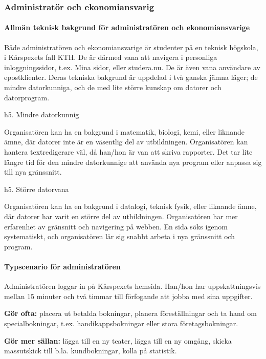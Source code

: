 \documentclass[a4paper, twoside, 11pt, titlepage]{article}
\begin{document}
		\subsubsection{Administratör och ekonomiansvarig}



			\paragraph{Allmän teknisk bakgrund för administratören och ekonomiansvarige}

			Både administratören och ekonomiansvarige är studenter på en teknisk högskola, i Kårspexets fall KTH. De är därmed vana att navigera i personliga inloggningssidor, t.ex. Mina sidor, eller studera.nu. De är även vana användare av epostklienter. Deras tekniska bakgrund är uppdelad i två ganska jämna läger; de mindre datorkunniga, och de med lite större kunskap om datorer och datorprogram. 

			h5. Mindre datorkunnig

			Organisatören kan ha en bakgrund i matematik, biologi, kemi, eller liknande ämne, där datorer inte är en väsentlig del av utbildningen. Organisatören kan hantera textredigerare väl, då han/hon är van att skriva rapporter. Det tar lite längre tid för den mindre datorkunnige att använda nya program eller anpassa sig till nya gränssnitt.

			h5. Större datorvana

			Organisatören kan ha en bakgrund i datalogi, teknisk fysik, eller liknande ämne, där datorer har varit en större del av utbildningen. Organisatören har mer erfarenhet av gränsnitt och navigering på webben. En sida söks igenom systematiskt, och organisatören lär sig snabbt arbeta i nya gränssnitt och program.

			\paragraph{Typscenario för administratören}

			Administratören loggar in på Kårspexets hemsida. Han/hon har uppskattningsvis mellan 15 minuter och två timmar till förfogande att jobba med sina uppgifter. 

			\textbf{Gör ofta:} placera ut betalda bokningar, planera föreställningar och ta hand om specialbokningar, t.ex. handikappsbokningar eller stora företagsbokningar. 

			\textbf{Gör mer sällan:} lägga till en ny teater, lägga till en ny omgång, skicka massutskick till b.la. kundbokningar, kolla på statistik.
\end{document}
